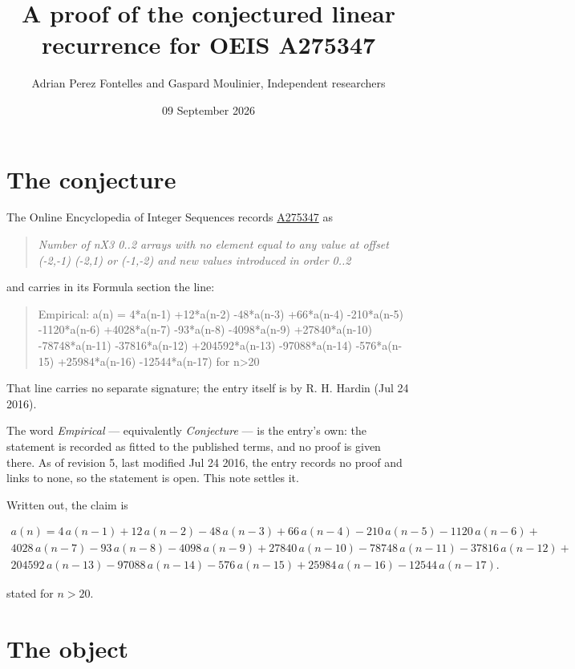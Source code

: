 \documentclass[11pt]{article}
\title{A proof of the conjectured linear recurrence for OEIS A275347}
\author{Adrian Perez Fontelles and Gaspard Moulinier, Independent researchers}
\date{09 September 2026}
\theoremstyle{definition}
\begin{document}
\maketitle
\section{The conjecture}

The Online Encyclopedia of Integer Sequences records \href{https://oeis.org/A275347}{A275347} as

\begin{quote}\itshape Number of nX3 0..2 arrays with no element equal to any value at offset (-2,-1) (-2,1) or (-1,-2) and new values introduced in order 0..2\end{quote}

and carries in its Formula section the line:

\begin{quote}\ttfamily Empirical: a(n) = 4*a(n-1) +12*a(n-2) -48*a(n-3) +66*a(n-4) -210*a(n-5) -1120*a(n-6) +4028*a(n-7) -93*a(n-8) -4098*a(n-9) +27840*a(n-10) -78748*a(n-11) -37816*a(n-12) +204592*a(n-13) -97088*a(n-14) -576*a(n-15) +25984*a(n-16) -12544*a(n-17) for n>20\end{quote}

That line carries no separate signature; the entry itself is by R. H. Hardin (Jul 24 2016).

The word {\itshape Empirical} --- equivalently {\itshape Conjecture} --- is the entry's own: the statement is recorded as fitted to the published terms, and no proof is given there. As of revision 5, last modified Jul 24 2016, the entry records no proof and links to none, so the statement is open. This note settles it.

Written out, the claim is

\begin{multline*} a(n) = 4\,a(n-1) + 12\,a(n-2) - 48\,a(n-3) + 66\,a(n-4) - 210\,a(n-5) - 1120\,a(n-6) + \\ 4028\,a(n-7) - 93\,a(n-8) - 4098\,a(n-9) + 27840\,a(n-10) - 78748\,a(n-11) - 37816\,a(n-12) + \\ 204592\,a(n-13) - 97088\,a(n-14) - 576\,a(n-15) + 25984\,a(n-16) - 12544\,a(n-17). \end{multline*}

stated for $n > 20$.

\section{The object}
\end{document}
